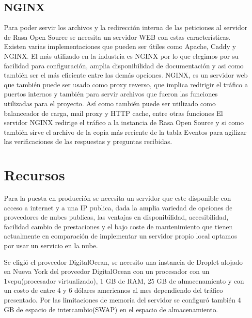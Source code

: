 \subsection{NGINX}
Para poder servir los archivos y la redirección interna de  las peticiones al servidor de Rasa Open
Source se necesita un servidor WEB con estas características. Existen  varias implementaciones que
pueden ser útiles como Apache, Caddy y NGINX. El más utilizado en la industria es NGINX por lo que
elegimos por su facilidad para configuración, amplia disponibilidad de documentación y asi como
también ser el más eficiente entre las demás opciones. \cite{web_servers}
NGINX, es un servidor web que también puede ser usado como proxy reverso, que implica redirigir el
tráfico a puertos internos y también para servir archivos que fueron las funciones utilizadas para
el proyecto. Así como también puede ser utilizado como balanceador de carga, mail proxy y HTTP
cache, entre otras funciones \cite{NGINX}
El servidor NGINX redirige el tráfico a la instancia de Rasa Open Source y si como también sirve el
archivo de
la copia más reciente de la tabla Eventos para agilizar las verificaciones de las respuestas y
preguntas recibidas.

\section{Recursos}
Para la puesta en producción se necesita un servidor que este disponible con acceso a internet y a
una IP publica, dada la amplia variedad de opciones de proveedores de nubes publicas, las ventajas
en disponibilidad, accesibilidad, facilidad cambio de prestaciones y el bajo
coste de mantenimiento que tienen actualmente en comparación de implementar un servidor propio
local optamos por usar un servicio en la nube. \cite{cloud_providers}

Se eligió el proveedor DigitalOcean, se necesito una instancia de Droplet alojado en Nueva
York del proveedor DigitalOcean con un procesador con un 1vcpu(procesador virtualizado), 1 GB de
RAM, 25 GB de almacenamiento y con un costo de entre 4 y 6 dólares americanos al mes dependiendo
del tráfico presentado. Por las limitaciones de memoria del servidor se configuró también 4 GB de
espacio de intercambio(SWAP) en el espacio de almacenamiento.

